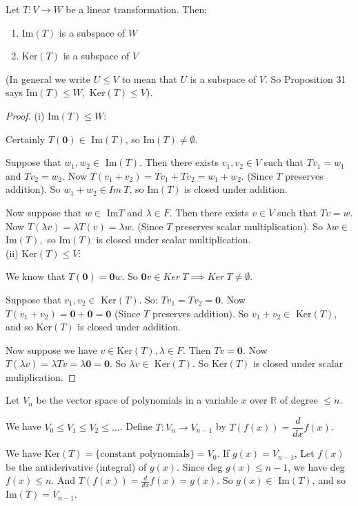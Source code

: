 \documentclass[10pt]{scrartcl}
\begin{document}
\begin{proposition} Let $T : V \to W$ be a linear transformation. Then:
\begin{enumerate}
\item Im$(T)$ is a subspace of $W$
\item Ker$(T)$ is a subspace of $V$
\end{enumerate}
\end{proposition}

(In general we write $U \leq V$ to mean that $U$ is a subspace of $V$. So Proposition 31 says Im$(T) \leq W, $ Ker$(T) \leq V$). 

\begin{proof}
(i) Im$(T) \leq W$: 

Certainly $T(\mathbf{0}) \in $ Im$(T)$, so Im$(T) \neq \emptyset$.

Suppose that $w_1, w_2 \in $ Im$(T)$. Then there exists $v_1, v_2 \in V$ such that $Tv_1 = w_1$ and $Tv_2 = w_2$. Now $T(v_1 + v_2) = Tv_1 + Tv_2 = w_1 + w_2$. (Since $T$ preserves addition). So $w_1 + w_2 \in Im ~T$, so Im$(T)$ is closed under addition. 

Now suppose that $w \in $ Im$T$ and $\lambda \in F$. Then there exists $v \in V$ such that $Tv = w$. Now $T(\lambda v) = \lambda T(v) = \lambda w$. (Since $T$ preserves scalar multiplication). So $\lambda w \in $ Im$(T),$ so Im$(T)$ is closed under scalar multiplication.\\

\noindent (ii) Ker$(T) \leq V$:

We know that $T(\mathbf{0}) = \mathbf{0}w.$ So $\mathbf{0}v \in Ker~ T \implies Ker~ T \neq \emptyset.$

Suppose that $v_1, v_2 \in $ Ker$(T)$. So: $Tv_1 = Tv_2 = \mathbf{0}.$ Now $T(v_1 + v_2) = \mathbf{0} + \mathbf{0} = \mathbf{0}$ (Since $T$ preserves addition). So $v_1 + v_2 \in $ Ker$(T)$, and so Ker$(T)$ is closed under addition.

Now suppose we have $v \in \text{Ker}(T), \lambda \in F.$ Then $Tv = \mathbf{0}.$ Now $T(\lambda v) = \lambda Tv = \lambda \mathbf{0} = \mathbf{0}.$ So $\lambda v \in $ Ker$(T).$ So Ker$(T)$ is closed under scalar muliplication. 
\end{proof}\vspace*{5pt}

\begin{example} Let $V_n$ be the vector space of polynomials in a variable $x$ over $\mathbb{R}$ of degree $\leq n$.

We have $V_0 \leq V_1 \leq V_2 \leq \dots$. Define $T: V_n \to V_{n-1}$ by $T(f(x)) = \dfrac{d}{dx} f(x)$. 

We have Ker$(T) = \{\text{constant polynomials} \} = V_0$. If $g(x) = V_{n-1}$, Let $f(x)$ be the antiderivative (integral) of $g(x)$. Since deg $g(x) \leq n-1$, we have deg $f(x) \leq n$. And $T(f(x)) = \frac{d}{dx}f(x) = g(x)$. So $g(x) \in $ Im$(T)$, and so Im$(T) = V_{n-1}$.
\end{example}\vspace*{5pt}
\end{document}
